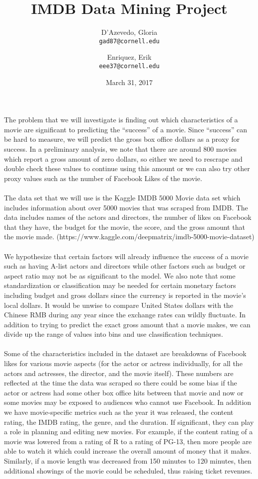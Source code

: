 \documentclass{article}
\title{IMDB Data Mining Project}
\author{
  D'Azevedo, Gloria\\
  \texttt{gad87@cornell.edu}
  \and
  Enriquez, Erik\\
  \texttt{eee37@cornell.edu}
}
\date{March 31, 2017}
\begin{document}
\maketitle

The problem that we will investigate is finding out which characteristics of a movie are significant to predicting the ``success'' of a movie.  Since ``success'' can be hard to measure, we will predict the gross box office dollars as a proxy for success.  In a preliminary analysis, we note that there are around 800 movies which report a gross amount of zero dollars, so either we need to rescrape and double check these values to continue using this amount or we can also try other proxy values such as the number of Facebook Likes of the movie.\\
\\
The data set that we will use is the Kaggle IMDB 5000 Movie data set which includes information about over 5000 movies that was scraped from IMDB.  The data includes names of the actors and directors, the number of likes on Facebook that they have, the budget for the movie, the score, and the gross amount that the movie made. (https://www.kaggle.com/deepmatrix/imdb-5000-movie-dataset) \\
\\
We hypothesize that certain factors will already influence the success of a movie such as having A-list actors and directors while other factors such as budget or aspect ratio may not be as significant to the model.  We also note that some standardization or classification may be needed for certain monetary factors including budget and gross dollars since the currency is reported in the movie's local dollars.  It would be unwise to compare United States dollars with the Chinese RMB during any year since the exchange rates can wildly fluctuate.  In addition to trying to predict the exact gross amount that a movie makes, we can divide up the range of values into bins and use classification techniques. \\
\\
Some of the characteristics included in the dataset are breakdowns of Facebook likes for various movie aspects (for the actor or actress individually, for all the actors and actresses, the director, and the movie itself).  These numbers are reflected at the time the data was scraped so there could be some bias if the actor or actress had some other box office hits between that movie and now or some movies may be exposed to audiences who cannot use Facebook.  In addition we have movie-specific metrics such as the year it was released, the content rating, the IMDB rating, the genre, and the duration.  If significant, they can play a role in planning and editing new movies.  For example, if the content rating of a movie was lowered from a rating of R to a rating of PG-13, then more people are able to watch it which could increase the overall amount of money that it makes.  Similarly, if a movie length was decreased from 150 minutes to 120 minutes, then additional showings of the movie could be scheduled, thus raising ticket revenues.\\
\end{document}
